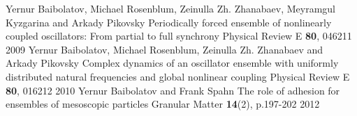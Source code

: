 \begin{cvhonors}
  \cvhonor
    {Yernur Baibolatov, Michael Rosenblum, Zeinulla Zh. Zhanabaev, Meyramgul Kyzgarina and Arkady Pikovsky}
    {Periodically forced ensemble of nonlinearly coupled oscillators: From partial to full synchrony}
    {Physical Review E {\bf{80}}, 046211}
    {2009}
  \cvhonor
    {Yernur Baibolatov, Michael Rosenblum, Zeinulla Zh. Zhanabaev and Arkady Pikovsky}
    {Complex dynamics of an oscillator ensemble with uniformly distributed natural frequencies and global nonlinear coupling}
    {Physical Review E {\bf{80}}, 016212}
    {2010}
  \cvhonor
    {Yernur Baibolatov and Frank Spahn}
    {The role of adhesion for ensembles of mesoscopic particles}
    {Granular Matter {\bf{14}}(2), p.197-202}
    {2012}  
\end{cvhonors}
